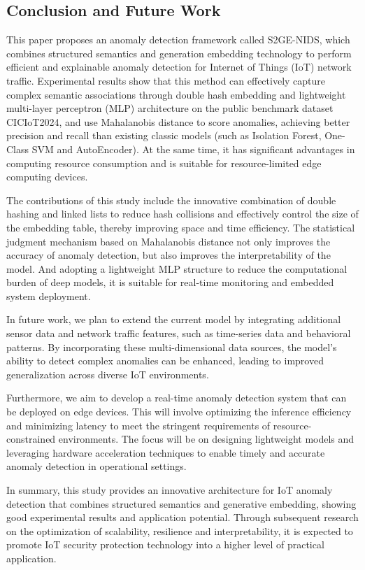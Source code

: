 \begin{ZhChapter}

    \chapter{Conclusion and Future Work}
    This paper proposes an anomaly detection framework called S2GE-NIDS, which combines structured semantics and generation embedding technology to perform efficient and explainable anomaly detection for Internet of Things (IoT) network traffic. Experimental results show that this method can effectively capture complex semantic associations through double hash embedding and lightweight multi-layer perceptron (MLP) architecture on the public benchmark dataset CICIoT2024, and use Mahalanobis distance to score anomalies, achieving better precision and recall than existing classic models (such as Isolation Forest, One-Class SVM and AutoEncoder). At the same time, it has significant advantages in computing resource consumption and is suitable for resource-limited edge computing devices.

    The contributions of this study include the innovative combination of double hashing and linked lists to reduce hash collisions and effectively control the size of the embedding table, thereby improving space and time efficiency. The statistical judgment mechanism based on Mahalanobis distance not only improves the accuracy of anomaly detection, but also improves the interpretability of the model. And adopting a lightweight MLP structure to reduce the computational burden of deep models, it is suitable for real-time monitoring and embedded system deployment.

    In future work, we plan to extend the current model by integrating additional sensor data and network traffic features, such as time-series data and behavioral patterns. By incorporating these multi-dimensional data sources, the model’s ability to detect complex anomalies can be enhanced, leading to improved generalization across diverse IoT environments.

    Furthermore, we aim to develop a real-time anomaly detection system that can be deployed on edge devices. This will involve optimizing the inference efficiency and minimizing latency to meet the stringent requirements of resource-constrained environments. The focus will be on designing lightweight models and leveraging hardware acceleration techniques to enable timely and accurate anomaly detection in operational settings.

    In summary, this study provides an innovative architecture for IoT anomaly detection that combines structured semantics and generative embedding, showing good experimental results and application potential. Through subsequent research on the optimization of scalability, resilience and interpretability, it is expected to promote IoT security protection technology into a higher level of practical application.

\end{ZhChapter}